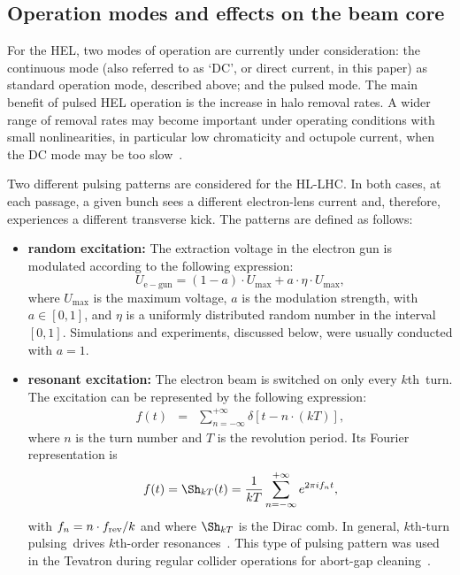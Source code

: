 \documentclass[
prstab
,reprint
,linenumbers
,longbibliography
,preprintnumbers
,showkeys
,amsfonts,amssymb,amsmath
,floatfix
]{revtex4-1}
\newcommand{\kth}{$k$th}
\newcommand{\kthtp}{$k$th-turn pulsing}
\begin{document}
\subsection{Operation modes and effects on the beam core}
\label{sec:hel:core}

For the HEL, two modes of operation are currently under consideration:
the continuous mode (also referred to as `DC', or direct current, in
this paper) as standard operation mode, described above; and the
pulsed mode. The main benefit of pulsed HEL operation is the increase
in halo removal rates. A wider range of removal rates may become
important under operating conditions with small nonlinearities, in
particular low chromaticity and octupole current, when the DC mode may
be too slow~\cite{hel_halo_hllhc_fitterer, hl_halo_ipac2017}.

Two different pulsing patterns are considered for the HL-LHC. In both
cases, at each passage, a given bunch sees a different electron-lens
current and, therefore, experiences a different transverse kick. The
patterns are defined as follows:

\begin{itemize}

\item \textbf{random excitation:} The extraction voltage in the
  electron gun is modulated according to the
  following expression:
%
  \begin{equation}
    \label{eq:random}
    U_{\mathrm{e-gun}} = (1-a) \cdot U_{\mathrm{max}} +
    a \cdot \eta \cdot U_{\mathrm{max}},
  \end{equation}
%
  where $U_{\mathrm{max}}$ is the maximum voltage, $a$ is the
  modulation strength, with $a \in [0,1]$, and $\eta$ is a uniformly
  distributed random number in the interval~$[0,1]$. Simulations and
  experiments, discussed below, were usually conducted with $a = 1$.

\item \textbf{resonant excitation:} The electron beam is switched on
  only every \kth\ turn. The excitation can be represented
  by the following expression:
  \begin{eqnarray}
    \label{intro:eqn:1}
    f(t) & = & \sum_{n=-\infty}^{+\infty}\delta\left[t-n\cdot(kT)\right],
  \end{eqnarray}
  where $n$ is the turn number and $T$ is the revolution period. Its
  Fourier representation is
  \begin{equation}
    \label{intro:eqn:2}
    f(t) = \Sh_{kT}(t) = \frac{1}{kT}\sum_{n=-\infty}^{+\infty}e^{2\pi i f_nt},
  \end{equation}
  with $f_n = n \cdot f_{\rm rev} / k$ and where $\Sh_{kT}$ is the
  Dirac comb. In general, \kthtp\ drives \kth-order
  resonances~\cite{md_sim_hel_res_ex_fitterer}. This type of pulsing
  pattern was used in the Tevatron during regular collider operations
  for abort-gap cleaning~\cite{hel_tevatron_abortgap_zhang}.
\end{itemize}
\end{document}
